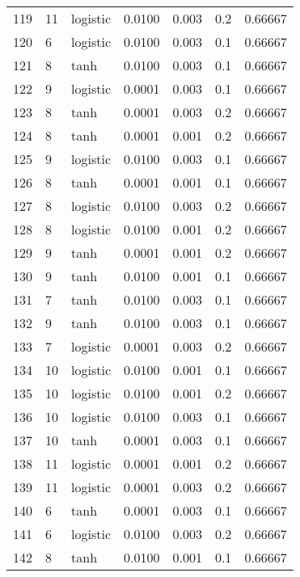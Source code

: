 \begin{tabular}{lllrrrr}
119 &          11 &  logistic &  0.0100 &  0.003 &  0.2 &   0.66667 \\
120 &           6 &  logistic &  0.0100 &  0.003 &  0.1 &   0.66667 \\
121 &           8 &      tanh &  0.0100 &  0.003 &  0.1 &   0.66667 \\
122 &           9 &  logistic &  0.0001 &  0.003 &  0.1 &   0.66667 \\
123 &           8 &      tanh &  0.0001 &  0.003 &  0.2 &   0.66667 \\
124 &           8 &      tanh &  0.0001 &  0.001 &  0.2 &   0.66667 \\
125 &           9 &  logistic &  0.0100 &  0.003 &  0.1 &   0.66667 \\
126 &           8 &      tanh &  0.0001 &  0.001 &  0.1 &   0.66667 \\
127 &           8 &  logistic &  0.0100 &  0.003 &  0.2 &   0.66667 \\
128 &           8 &  logistic &  0.0100 &  0.001 &  0.2 &   0.66667 \\
129 &           9 &      tanh &  0.0001 &  0.001 &  0.2 &   0.66667 \\
130 &           9 &      tanh &  0.0100 &  0.001 &  0.1 &   0.66667 \\
131 &           7 &      tanh &  0.0100 &  0.003 &  0.1 &   0.66667 \\
132 &           9 &      tanh &  0.0100 &  0.003 &  0.1 &   0.66667 \\
133 &           7 &  logistic &  0.0001 &  0.003 &  0.2 &   0.66667 \\
134 &          10 &  logistic &  0.0100 &  0.001 &  0.1 &   0.66667 \\
135 &          10 &  logistic &  0.0100 &  0.001 &  0.2 &   0.66667 \\
136 &          10 &  logistic &  0.0100 &  0.003 &  0.1 &   0.66667 \\
137 &          10 &      tanh &  0.0001 &  0.003 &  0.1 &   0.66667 \\
138 &          11 &  logistic &  0.0001 &  0.001 &  0.2 &   0.66667 \\
139 &          11 &  logistic &  0.0001 &  0.003 &  0.2 &   0.66667 \\
140 &           6 &      tanh &  0.0001 &  0.003 &  0.1 &   0.66667 \\
141 &           6 &  logistic &  0.0100 &  0.003 &  0.2 &   0.66667 \\
142 &           8 &      tanh &  0.0100 &  0.001 &  0.1 &   0.66667 \\

\end{tabular}
